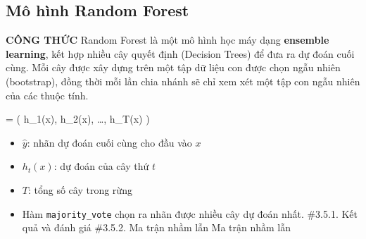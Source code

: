 \documentclass[
]{article}
\newenvironment{Shaded}{\begin{snugshade}}{\end{snugshade}}
\newcommand{\AttributeTok}[1]{\textcolor[rgb]{0.13,0.29,0.53}{#1}}
\newcommand{\DecValTok}[1]{\textcolor[rgb]{0.00,0.00,0.81}{#1}}
\newcommand{\FunctionTok}[1]{\textcolor[rgb]{0.13,0.29,0.53}{\textbf{#1}}}
\newcommand{\NormalTok}[1]{#1}
\newcommand{\OtherTok}[1]{\textcolor[rgb]{0.56,0.35,0.01}{#1}}
\newcommand{\SpecialCharTok}[1]{\textcolor[rgb]{0.81,0.36,0.00}{\textbf{#1}}}
\newcommand{\StringTok}[1]{\textcolor[rgb]{0.31,0.60,0.02}{#1}}
\providecommand{\tightlist}{%
  \setlength{\itemsep}{0pt}\setlength{\parskip}{0pt}}
\begin{document}
\subsection{Mô hình Random Forest}\label{sec-rf}

\textbf{CÔNG THỨC} Random Forest là một mô hình học máy dạng
\textbf{ensemble learning}, kết hợp nhiều cây quyết định (Decision
Trees) để đưa ra dự đoán cuối cùng. Mỗi cây được xây dựng trên một tập
dữ liệu con được chọn ngẫu nhiên (bootstrap), đồng thời mỗi lần chia
nhánh sẽ chỉ xem xét một tập con ngẫu nhiên của các thuộc tính.

 =  \left( h\_1(x), h\_2(x), \ldots, h\_T(x)
\right)

\begin{itemize}
\tightlist
\item
  \(\hat{y}\): nhãn dự đoán cuối cùng cho đầu vào \(x\)\\
\item
  \(h_t(x)\): dự đoán của cây thứ \(t\)\\
\item
  \(T\): tổng số cây trong rừng\\
\item
  Hàm \texttt{majority\_vote} chọn ra nhãn được nhiều cây dự đoán nhất.
  \#3.5.1. Kết quả và đánh giá \#3.5.2. Ma trận nhầm lẫn Ma trận nhầm
  lẫn
\end{itemize}

\begin{Shaded}
\end{Shaded}
\end{document}
